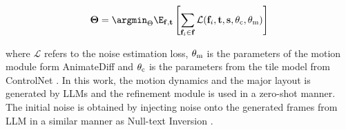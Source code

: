 
\begin{equation}
    \mathbf{\Theta} = \argmin_\Theta \E_{\mathbf{f}, \mathbf{t}} \left[ \sum_{\mathbf{f}_i \in \mathbf{f}} \mathcal{L}(\mathbf{f}_i, \mathbf{t}, \mathbf{s}, \theta_{\rm c}, \theta_{\rm m}) \right]
\end{equation}




    where $\mathcal{L}$ refers to the noise estimation loss, $\theta_{\rm m}$ is the parameters of the motion module form AnimateDiff \cite{guo2023animatediff} and  $\theta_{\rm c}$ is the parameters from the tile model from ControlNet \cite{controlnet}. In this work, the motion dynamics and the major layout is generated by LLMs and the refinement module is used in a zero-shot manner. The initial noise is obtained by injecting noise onto the generated frames from LLM in a similar manner as Null-text Inversion \cite{mokady2023null}.

